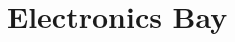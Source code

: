 \documentclass[../../main]{subfiles}
\begin{document}
\section{Electronics Bay} \label{sec:}
\end{document}
